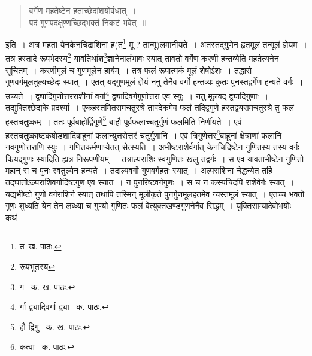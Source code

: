 \documentclass[11pt, openany]{book}
\begin{document}
{\begin{quote}
{\qt वर्गेण महतेष्टेन हताच्छेदांशयोर्वधात्~।\\
पदं गुणपदक्षुण्णच्छिद्भक्तं निकटं भवेत्~॥}
\end{quote}

\noindent इति~। अत्र महता येनकेनचिद्राशिना ह(तं\renewcommand{\thefootnote}{३}\footnote{त\textendash\ ख. पाठः.} मू ? तान्मू)लमानीयते~। अतस्तद्गुणेन हृतमूलं तन्मूलं ज्ञेयम~। तत्र हस्तादे रूपभेदस्य\renewcommand{\thefootnote}{४}\footnote{रूपभूतस्य} यावतिथांश\renewcommand{\thefootnote}{५}\footnote{ग \textendash\ क. ख. पाठः.}ज्ञानेनालंभावः स्यात् तावतो वर्गेण करणी हन्तव्येति महतेत्यनेन सूचितम्~। करणीमूलं च गुणमूलेन हार्यम्~। तत्र फलं रूपात्मकं मूलं शेषोऽंशः~। तद्धारो गुणवर्गमूलतुल्यच्छेदः स्यात्~। एतत् यद्गुणमूलं ज्ञेयं ननु तेनैव वर्गो हन्तव्यः कुतः पुनस्तद्वर्गेण हन्यते वर्गः~। उच्यते~। द्व्यादिगुणोत्तरराशीनां वर्गा\renewcommand{\thefootnote}{६}\footnote{र्गा द्व्यादिवर्गा द्व्या \textendash\ क. पाठः.} द्व्यादिवर्गगुणोत्तरा एव स्युः~। नतु मूलवद् द्व्यादिगुणाः~। तद्युक्तिश्छेद्यके प्रदर्श्या~। एकहस्तमितसमचतुरश्रे तावदेकमेव फलं तद्द्विगुणे हस्तद्वयसमचतुरश्रे तु फलं हस्तचतुष्कम्~। ततः पूर्वबाहोर्द्विगुणे\renewcommand{\thefootnote}{७}\footnote{हौ द्विगु \textendash\ क. ख. पाठः.} बाहौ पूर्वफलाच्चतुर्गुणं फलमिति निर्णीयते~। एवं हस्तचतुष्काष्टकषोडशादिबाहूनां फलान्युत्तरोत्तरं चतुर्गुणानि~। एवं त्रिगुणेत्तर\renewcommand{\thefootnote}{८}\footnote{कत्वा \textendash\ क. पाठः.}बाहूनां क्षेत्राणां फलानि नवगुणोत्तराणि स्युः~। गणितकर्मणाप्येतत् सेत्स्यति~। अभीष्टराशेर्वर्गात् केनचिदिष्टेन गुणितस्य तस्य वर्गः कियद्गुणः स्यादिति ह्यत्र निरूपणीयम्~। तत्राल्पराशिः स्वगुणितः खलु तद्वर्गः~। स एव यावताभीष्टेन गुणितो महान् स च पुनः स्वतुल्येन हन्यते~। तदाल्पवर्गो गुणवर्गहतः स्यात्~। अल्पराशिना चेद्धन्येत तर्हि तद्घातोऽल्पराशिवर्गादिष्टगुण एव स्यात~। न पुनरिष्टवर्गगुणः~। स च न कस्यचिदपि राशेर्वर्गः स्यात्~।
यद्यभीष्टो गुणो वर्गराशिर्न स्यात् तथापि तस्मिन् मूलीकृते पुनर्गुणमूलहतमेव न्यस्तमूलं स्यात्~। एतच्च {\qt भक्तो गुणः शुध्यति येन तेन लब्ध्या च गुण्यो गुणितः फलं वे}त्युक्तखण्डगुणनेनैव सिद्धम्~। युक्तिसाम्यादेवोभयोः~। कथं


\newpage 

}
\end{document}

